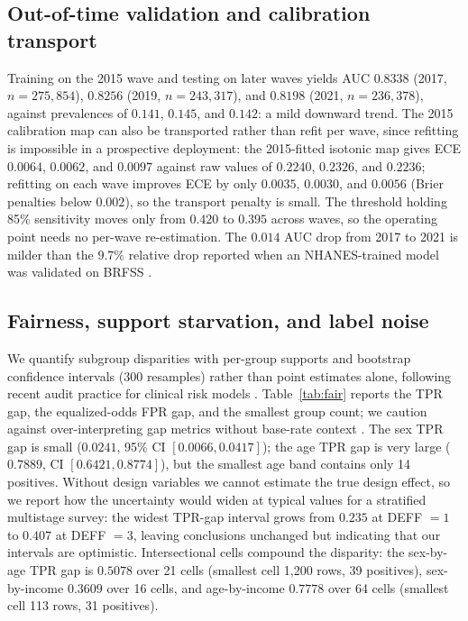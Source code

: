\documentclass[conference]{IEEEtran}
\begin{document}
\subsection{Out-of-time validation and calibration transport}
Training on the 2015 wave and testing on later waves yields AUC $0.8338$ (2017, $n = 275{,}854$), $0.8256$ (2019, $n = 243{,}317$), and $0.8198$ (2021, $n = 236{,}378$), against prevalences of $0.141$, $0.145$, and $0.142$: a mild downward trend. The 2015 calibration map can also be transported rather than refit per wave, since refitting is impossible in a prospective deployment: the 2015-fitted isotonic map gives ECE $0.0064$, $0.0062$, and $0.0097$ against raw values of $0.2240$, $0.2326$, and $0.2236$; refitting on each wave improves ECE by only $0.0035$, $0.0030$, and $0.0056$ (Brier penalties below $0.002$), so the transport penalty is small. The threshold holding 85\% sensitivity moves only from $0.420$ to $0.395$ across waves, so the operating point needs no per-wave re-estimation. The $0.014$ AUC drop from 2017 to 2021 is milder than the $9.7\%$ relative drop reported when an NHANES-trained model was validated on BRFSS \cite{pall2026comprehensive}.

\subsection{Fairness, support starvation, and label noise}
We quantify subgroup disparities with per-group supports and bootstrap confidence intervals (300 resamples) rather than point estimates alone, following recent audit practice for clinical risk models \cite{roy2026kaisen}. Table~\ref{tab:fair} reports the TPR gap, the equalized-odds FPR gap, and the smallest group count; we caution against over-interpreting gap metrics without base-rate context \cite{mehrabi2021}. The sex TPR gap is small ($0.0241$, 95\% CI $[0.0066, 0.0417]$); the age TPR gap is very large ($0.7889$, CI $[0.6421, 0.8774]$), but the smallest age band contains only 14 positives. Without design variables we cannot estimate the true design effect, so we report how the uncertainty would widen at typical values for a stratified multistage survey: the widest TPR-gap interval grows from $0.235$ at DEFF $=1$ to $0.407$ at DEFF $=3$, leaving conclusions unchanged but indicating that our intervals are optimistic. Intersectional cells compound the disparity: the sex-by-age TPR gap is $0.5078$ over 21 cells (smallest cell 1{,}200 rows, 39 positives), sex-by-income $0.3609$ over 16 cells, and age-by-income $0.7778$ over 64 cells (smallest cell 113 rows, 31 positives).
\end{document}
